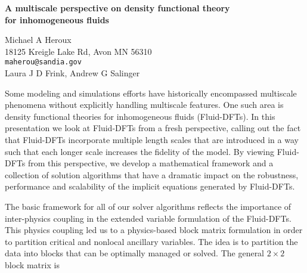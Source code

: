 \documentclass[twosided]{report}
\begin{document}
\begin{center}
{\large			%
{\bf A multiscale perspective on density functional theory \\
for inhomogeneous fluids}}

	Michael A Heroux \\
	18125 Kreigle Lake Rd,  Avon MN 56310 \\
	{\tt maherou@sandia.gov} \\
	Laura J D Frink, Andrew G Salinger
\end{center}
Some modeling and simulations efforts have historically
encompassed multiscale phenomena without explicitly handling
multiscale features. One such area is density functional
theories for inhomogeneous fluids (Fluid-DFTs). In this
presentation we look at Fluid-DFTs from a fresh perspective,
calling out the fact that Fluid-DFTs incorporate multiple
length scales that are introduced in a way such that each
longer scale increases the fidelity of the model. By viewing
Fluid-DFTs from this perspective, we develop a mathematical
framework and a collection of solution algorithms that have
a dramatic impact on the robustness, performance and
scalability of the implicit equations generated by
Fluid-DFTs.

The basic
framework for all of our solver algorithms reflects the
importance of inter-physics coupling in the extended
variable formulation of the
Fluid-DFTs.
This physics coupling led
us to a physics-based block matrix formulation in order to
partition critical and nonlocal ancillary variables. The
idea is to partition the data into blocks that can be
optimally managed or solved. The general $2\times 2$ block
matrix is
\end{document}
